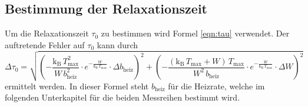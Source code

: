 \subsection{Bestimmung der Relaxationszeit}
Um die Relaxationszeit $\tau_0$ zu bestimmen wird Formel \ref{eqn:tau}
verwendet.
Der auftretende Fehler auf $\tau_0$ kann durch
\begin{equation}
  \Delta \tau_0 = \sqrt{
  \left(-\frac{\text{k}_\text{B} \, T_\text{max}^2}{W \, b_\text{heiz}^2} \cdot
  e^{-\frac{W}{\text{k}_\text{B} \, T_\text{max}}} \cdot \Delta b_\text{heiz}
  \right)^2 +
  \left(-\frac{(\text{k}_\text{B} \, T_\text{max} + W) \, T_\text{max}}{W^2 \,
  b_\text{heiz}} \cdot
  e^{-\frac{W}{\text{k}_\text{B} \, T_\text{max}}} \cdot \Delta W \right)^2
  }
  \label{eqn:tau_fehler}
\end{equation}
ermittelt werden. In dieser Formel steht $b_\text{heiz}$ für die Heizrate,
welche im folgenden Unterkapitel für die beiden Messreihen bestimmt wird.
